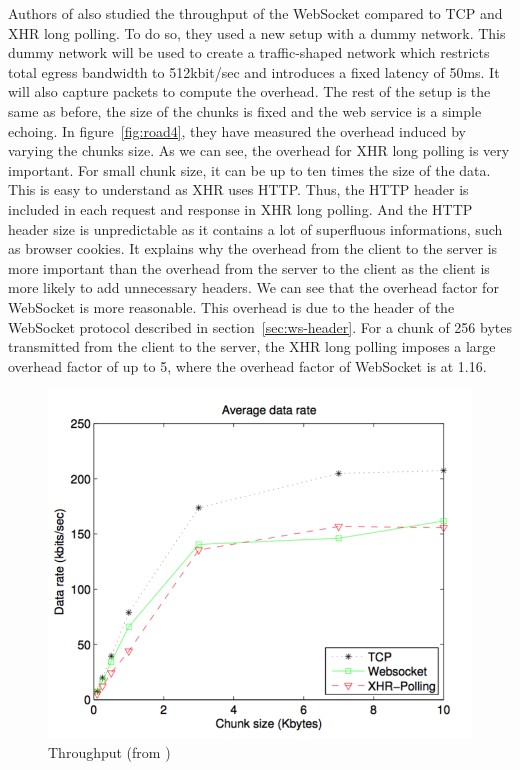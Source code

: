 \documentclass[10pt,journal,compsoc]{IEEEtran}
\newcommand{\ws}{WebSocket}
\begin{document}
Authors of \cite{roadblock} also studied the throughput of the \ws{} compared to TCP and XHR long polling.
To do so, they used a new setup with a dummy network.
This dummy network will be used to create a traffic-shaped network which restricts total egress bandwidth to 512kbit/sec and introduces a fixed latency of 50ms.
It will also capture packets to compute the overhead.
The rest of the setup is the same as before, the size of the chunks is fixed and the web service is a simple echoing.
In figure~\ref{fig:road4}, they have measured the overhead induced by varying the chunks size.
As we can see, the overhead for XHR long polling is very important.
For small chunk size, it can be up to ten times the size of the data.
This is easy to understand as XHR uses HTTP.
Thus, the HTTP header is included in each request and response in XHR long polling.
And the HTTP header size is unpredictable as it contains a lot of superfluous informations, such as browser cookies.
It explains why the overhead from the client to the server is more important than the overhead from the server to the client as the client is more likely to add unnecessary headers.
We can see that the overhead factor for \ws{} is more reasonable.
This overhead is due to the header of the \ws{} protocol described in section~\ref{sec:ws-header}.
For a chunk of 256 bytes transmitted from the client to the server, the XHR long polling imposes a large overhead factor of up to 5, where the overhead factor of \ws{} is at 1.16.


\begin{figure}[!ht]
    \centering
    \includegraphics[width=\linewidth]{road3.png}
    \caption{Throughput (from \cite{roadblock})}
    \label{fig:road3}
\end{figure}
\end{document}
